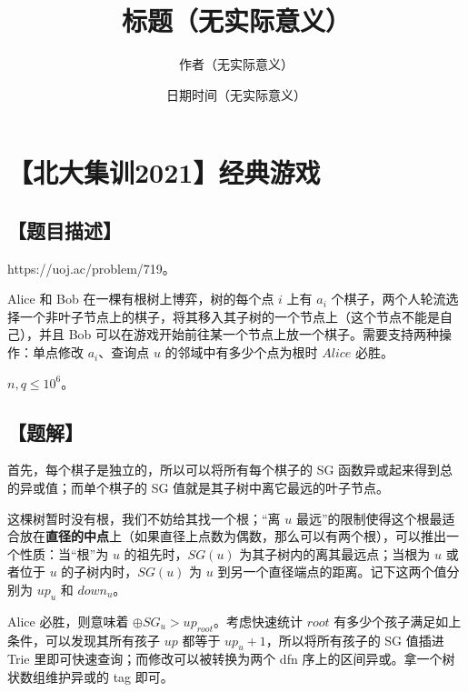 \documentclass[UTF8,12pt,a4paper]{ctexart}
\title{标题（无实际意义）}
\author{作者（无实际意义）}
\date{日期时间（无实际意义）}
\begin{document}
	\fontsize{12pt}{12pt}\selectfont
	
	\newpage
	\pagestyle{fancy}
	
	
	
	\section*{【北大集训2021】经典游戏}
	
	\subsection*{【题目描述】}
	
	https://uoj.ac/problem/719。
	
	Alice 和 Bob 在一棵有根树上博弈，树的每个点 $i$ 上有 $a_i$ 个棋子，两个人轮流选择一个非叶子节点上的棋子，将其移入其子树的一个节点上（这个节点不能是自己），并且 Bob 可以在游戏开始前往某一个节点上放一个棋子。需要支持两种操作：单点修改 $a_i$、查询点 $u$ 的邻域中有多少个点为根时 $Alice$ 必胜。
	
	$n,q\le 10^6$。
	
	
	\subsection*{【题解】}
	
	首先，每个棋子是独立的，所以可以将所有每个棋子的 SG 函数异或起来得到总的异或值；而单个棋子的 SG 值就是其子树中离它最远的叶子节点。
	
	这棵树暂时没有根，我们不妨给其找一个根；“离 $u$ 最远”的限制使得这个根最适合放在\textbf{直径的中点}上（如果直径上点数为偶数，那么可以有两个根），可以推出一个性质：当“根”为 $u$ 的祖先时，$SG(u)$ 为其子树内的离其最远点；当根为 $u$ 或者位于 $u$ 的子树内时，$SG(u)$ 为 $u$ 到另一个直径端点的距离。记下这两个值分别为 $up_u$ 和 $down_u$。
	
	Alice 必胜，则意味着 $\oplus SG_u> up_{root}$。考虑快速统计 $root$ 有多少个孩子满足如上条件，可以发现其所有孩子 $up$ 都等于 $up_u+1$，所以将所有孩子的 SG 值插进 Trie 里即可快速查询；而修改可以被转换为两个 dfn 序上的区间异或。拿一个树状数组维护异或的 tag 即可。
	
	
\end{document}
